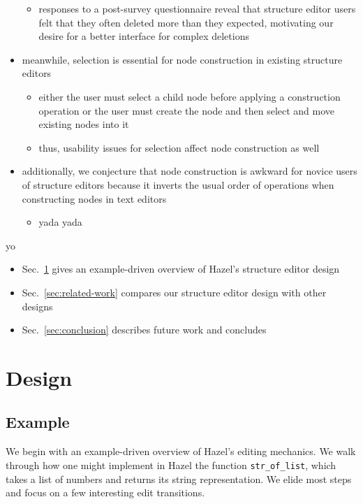 \documentclass[runningheads]{llncs}
\newcommand{\Hazel}{\textsf{Hazel}\xspace}
\begin{document}
\begin{itemize}
		\begin{itemize}
			\item responses to a post-survey questionnaire reveal that structure editor users felt that they often deleted more than they expected, motivating our desire for a better interface for complex deletions
		\end{itemize}
	\item meanwhile, selection is essential for node construction in existing structure editors
		\begin{itemize}
			\item either the user must select a child node before applying a construction operation or the user must create the node and then select and move existing nodes into it
			\item thus, usability issues for selection affect node construction as well
		\end{itemize}
	\item additionally, we conjecture that node construction is awkward for novice users of structure editors because it inverts the usual order of operations when constructing nodes in text editors
		\begin{itemize}
			\item yada yada 
		\end{itemize}
\end{itemize}

 yo
\begin{itemize}
\item Sec.~\ref{sec:example} gives an example-driven overview of \Hazel's structure editor design
\item Sec.~\ref{sec:related-work} compares our structure editor design with other designs
\item Sec.~\ref{sec:conclusion} describes future work and concludes
\end{itemize}

\section{Design} \label{sec:example}

\subsection{Example}

We begin with an example-driven overview of \Hazel's editing mechanics.
We walk through how one might implement in \Hazel the function \texttt{str\_of\_list},
which takes a list of numbers and returns its string representation. We
elide most steps and focus on a few interesting edit transitions.
\end{document}
